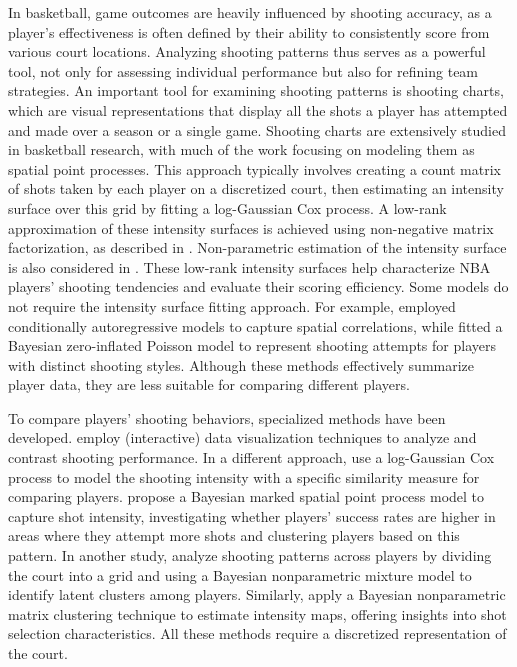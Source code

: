 In basketball, game outcomes are heavily influenced by shooting accuracy, as a player's effectiveness is often defined by their ability to consistently score from various court locations. 
Analyzing shooting patterns thus serves as a powerful tool, not only for assessing individual performance but also for refining team strategies. An important tool for examining shooting patterns is shooting charts, which are visual representations that display all the shots a player has attempted and made over a season or a single game. Shooting charts are extensively studied in basketball research, with much of the work focusing on modeling them as spatial point processes. This approach typically involves creating a count matrix of shots taken by each player on a discretized court, then estimating an intensity surface over this grid by fitting a log-Gaussian Cox process. A low-rank approximation of these intensity surfaces is achieved using non-negative matrix factorization, as described in \citet{millerFactorizedPointProcess2014,franksCharacterizingSpatialStructure2015}. Non-parametric estimation of the intensity surface is also considered in \cite{yinBayesianNonparametricLearning2022}. These low-rank intensity surfaces help characterize NBA players’ shooting tendencies and evaluate their scoring efficiency. Some models do not require the intensity surface fitting approach. For example, \cite{reichSpatialAnalysisBasketball2006} employed conditionally autoregressive models to capture spatial correlations, while \cite{huZeroinflatedPoissonModel2023} fitted a Bayesian zero-inflated Poisson model to represent shooting attempts for players with distinct shooting styles. Although these methods effectively summarize player data, they are less suitable for comparing different players.


To compare players' shooting behaviors, specialized methods have been developed. \citet{fuHoopInSightAnalyzingComparing2024} employ (interactive) data visualization techniques to analyze and contrast shooting performance. In a different approach, \citet{huBayesianGroupLearning2021} use a log-Gaussian Cox process to model the shooting intensity with a specific similarity measure for comparing players. \citet{jiaoBayesianMarkedSpatial2021} propose a Bayesian marked spatial point process model to capture shot intensity, investigating whether players’ success rates are higher in areas where they attempt more shots and clustering players based on this pattern. In another study, \citet{wong-toiJointAnalysisField2022} analyze shooting patterns across players by dividing the court into a grid and using a Bayesian nonparametric mixture model to identify latent clusters among players. Similarly, \citet{yinAnalysisProfessionalBasketball2023} apply a Bayesian nonparametric matrix clustering technique to estimate intensity maps, offering insights into shot selection characteristics. All these methods require a discretized representation of the court.


